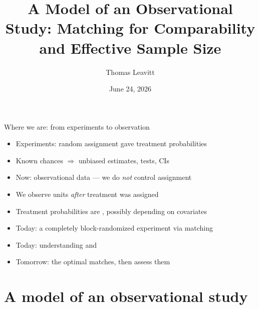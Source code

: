 \documentclass[table, xcolor = {dvipsnames}, 9pt]{beamer}
\title[A model of an observational study]{A Model of an Observational Study: Matching for Comparability and Effective Sample Size}
\author{Thomas Leavitt}
\institute[]
{
\medskip
\textit{}
}
\date{June 24, 2026}
\theoremstyle{plain}
\newcommand{\mh}[1]{{\color{magenta}{#1}}}
\begin{document}
\begin{frame}
\titlepage
\end{frame}

\begin{frame}[t]{Where we are: from experiments to observation}
\vfill
\begin{itemize} \vfill
\item Experiments: random assignment gave \mh{known} treatment probabilities \vfill
\item Known chances $\Rightarrow$ unbiased estimates, tests, CIs \vfill
\item Now: observational data --- we do \emph{not} control assignment \vfill
\item We observe units \emph{after} treatment was assigned \vfill
\item Treatment probabilities are \mh{unknown}, possibly depending on covariates \vfill
\item Today: \mh{recreate} a completely block-randomized experiment via matching \vfill
\item Today: understanding \mh{comparability} and \mh{effective sample size} \vfill
\item Tomorrow: \mh{construct} the optimal matches, then assess them \vfill
\end{itemize} \vfill
\end{frame}
\section{A model of an observational study}
\end{document}
